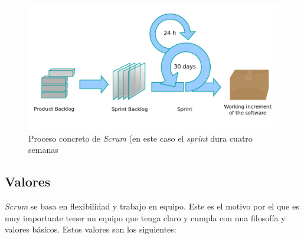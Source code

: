 \begin{figure}[H]
		\includegraphics[width=\textwidth,height=\textheight,keepaspectratio]{./img/scrumprocess.png}
	\caption{Proceso concreto de \textit{Scrum} (en este caso el \textit{sprint} dura cuatro semanas}
	\label{fig:scrumproceso}
\end{figure}

\subsection{Valores}

\textit{Scrum} se basa en flexibilidad y trabajo en equipo. Este es el motivo por el que es muy importante tener un equipo que tenga claro y cumpla con una filosofía y valores básicos. Estos valores son los siguientes:

